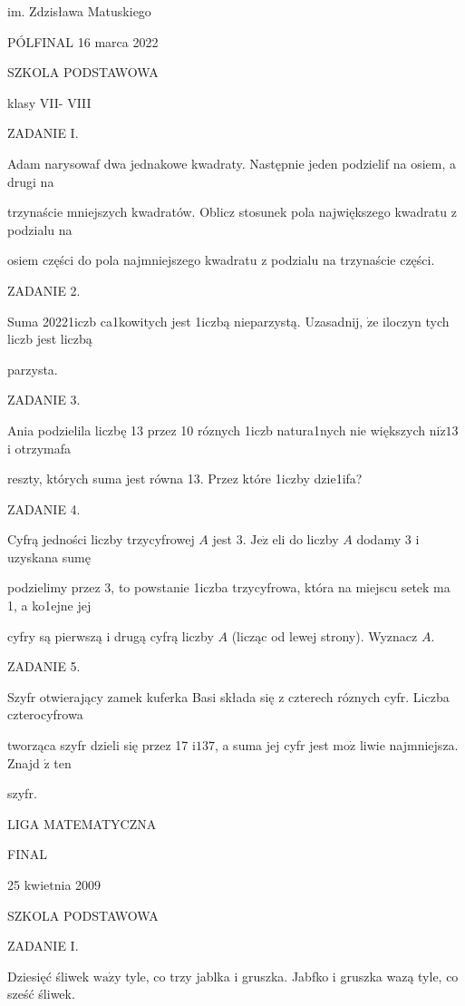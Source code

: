 \documentclass[a4paper,12pt]{article}
\begin{document}
im. Zdzisława Matuskiego

PÓLFINAL 16 marca 2022

SZKOLA PODSTAWOWA

klasy VII- VIII

ZADANIE I.

Adam narysowaf dwa jednakowe kwadraty. Następnie jeden podzielif na osiem, a drugi na

trzynaście mniejszych kwadratów. Oblicz stosunek pola największego kwadratu z podzialu na

osiem części do pola najmniejszego kwadratu z podzialu na trzynaście części.

ZADANIE 2.

Suma 20221iczb ca1kowitych jest 1iczbą nieparzystą. Uzasadnij, $\dot{\mathrm{z}}\mathrm{e}$ iloczyn tych liczb jest liczbą

parzysta.

ZADANIE 3.

Ania podzielila liczbę 13 przez 10 róznych 1iczb natura1nych nie większych $\mathrm{n}\mathrm{i}\dot{\mathrm{z}}13$ i otrzymafa

reszty, których suma jest równa 13. Przez które 1iczby dzie1ifa?

ZADANIE 4.

Cyfrą jedności liczby trzycyfrowej $A$ jest 3. $\mathrm{J}\mathrm{e}\dot{\mathrm{z}}$ eli do liczby $A$ dodamy 3 i uzyskana sumę

podzielimy przez 3, to powstanie 1iczba trzycyfrowa, która na miejscu setek ma 1, a ko1ejne jej

cyfry są pierwszą i drugą cyfrą liczby $A$ (licząc od lewej strony). Wyznacz $A.$

ZADANIE 5.

Szyfr otwierający zamek kuferka Basi składa się z czterech róznych cyfr. Liczba czterocyfrowa

tworząca szyfr dzieli się przez 17 $\mathrm{i}137$, a suma jej cyfr jest $\mathrm{m}\mathrm{o}\dot{\mathrm{z}}$ liwie najmniejsza. Znajd $\acute{\mathrm{z}}$ ten

szyfr.






LIGA MATEMATYCZNA

FINAL

25 kwietnia 2009

SZKOLA PODSTAWOWA

ZADANIE I.

Dziesięć śliwek $\mathrm{w}\mathrm{a}\dot{\mathrm{z}}\mathrm{y}$ tyle, co trzy jablka i gruszka. Jabfko i gruszka wazą tyle, co sześć śliwek.
\end{document}
